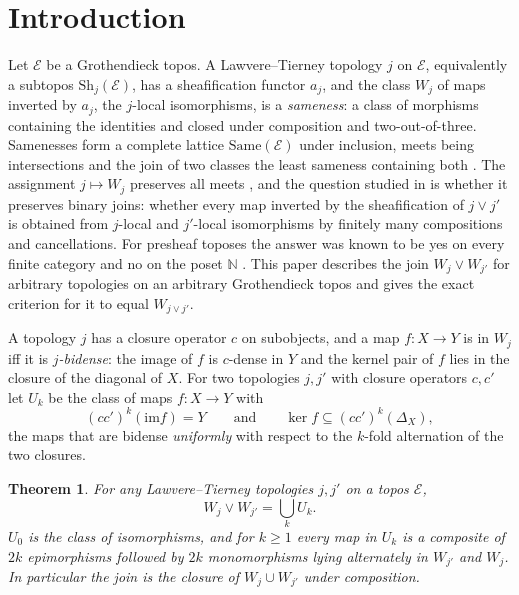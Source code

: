 \documentclass[11pt]{amsart}
\newtheorem{thm}{Theorem}[section]
\theoremstyle{definition}
\newcommand{\Same}{\mathrm{Same}}
\newcommand{\im}{\mathrm{im}}
\newcommand{\Sh}{\mathrm{Sh}}
\newcommand{\cE}{\mathcal E}
\begin{document}
\maketitle

\section{Introduction}

Let $\cE$ be a Grothendieck topos. A Lawvere--Tierney topology $j$ on $\cE$,
equivalently a subtopos $\Sh_j(\cE)$, has a sheafification functor $a_j$, and
the class $W_j$ of maps inverted by $a_j$, the $j$-local isomorphisms, is a
\emph{sameness}: a class of morphisms containing the identities and closed
under composition and two-out-of-three. Samenesses form a complete lattice
$\Same(\cE)$ under inclusion, meets being intersections and the join of
two classes the least sameness containing both \cite{Same}. The assignment
$j\mapsto W_j$ preserves all meets \cite[Thm.~3.1]{Topjoin}, and the question
studied in \cite{Topjoin,Finitejoin} is whether it preserves binary joins:
whether every map inverted by the sheafification of $j\vee j'$ is obtained
from $j$-local and $j'$-local isomorphisms by finitely many compositions and
cancellations. For presheaf toposes the answer was known to be yes on every
finite category \cite{Finitejoin} and no on the poset $\mathbb N$
\cite[Thm.~7.1]{Topjoin}. This paper describes the join $W_j\vee W_{j'}$ for
arbitrary topologies on an arbitrary Grothendieck topos and gives the exact
criterion for it to equal $W_{j\vee j'}$.

A topology $j$ has a closure operator $c$ on subobjects, and a map
$f\colon X\to Y$ is in $W_j$ iff it is \emph{$j$-bidense}: the image of $f$
is $c$-dense in $Y$ and the kernel pair of $f$ lies in the closure of the
diagonal of $X$. For two topologies $j,j'$ with closure operators $c,c'$ let
$U_k$ be the class of maps $f\colon X\to Y$ with
\[
(cc')^k(\im f)=Y\qquad\text{and}\qquad\ker f\subseteq(cc')^k(\Delta_X),
\]
the maps that are bidense \emph{uniformly} with respect to the $k$-fold
alternation of the two closures.

\begin{thm}\label{thm:A}
For any Lawvere--Tierney topologies $j,j'$ on a topos $\cE$,
\[
W_j\vee W_{j'}=\bigcup_kU_k .
\]
$U_0$ is the class of isomorphisms, and for $k\ge1$ every map in $U_k$ is a
composite of $2k$ epimorphisms followed by $2k$ monomorphisms lying
alternately in $W_{j'}$ and $W_j$. In particular the join is the closure of
$W_j\cup W_{j'}$ under composition.
\end{thm}
\end{document}
